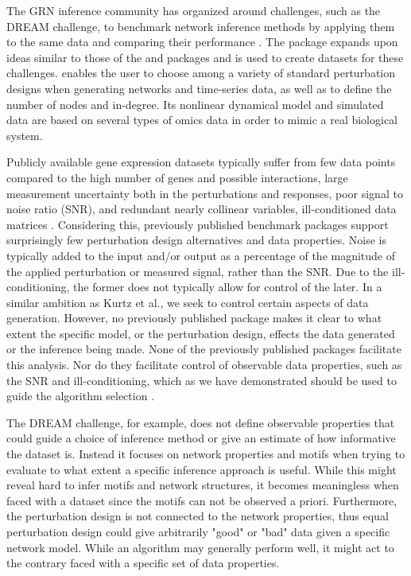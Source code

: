 The GRN inference community has organized around challenges, such as the DREAM
challenge, to benchmark network inference methods by applying them to the same data and comparing their performance \citep{Marbach2012}.
The package \emph{\gnw} \citep{Schaffter2011} expands upon ideas similar to those of the \emph{\syntren} and \emph{\genge} packages and is used to create datasets for these challenges.
\emph{\gnw} enables the user to choose among a variety of \insilico standard perturbation designs when generating networks and time-series data, as well as to define the number of nodes and in-degree.
Its nonlinear dynamical model and simulated data are based on several types of omics data in order to mimic a real biological system.

Publicly available gene expression datasets typically suffer from few data points compared to the high number of genes and possible interactions, large measurement uncertainty both in the perturbations and responses, \ie poor signal to noise ratio (SNR), and redundant nearly collinear variables, \ie ill-conditioned data matrices \citep{Nordling2013phdthesis}.
Considering this, previously published benchmark packages support surprisingly few perturbation design alternatives and data properties.
Noise is typically added to the input and/or output as a percentage of the magnitude of the applied perturbation or measured signal, rather than the SNR. Due to the ill-conditioning, the former does not typically allow for control of the later.
In a similar ambition as Kurtz et al.\cite{SPIEC-EASI2015}, we seek to control certain aspects of data generation.%
However, no previously published package makes it clear to what extent the specific model, or the perturbation design, effects the data generated or the inference being made.
None of the previously published packages facilitate this analysis. Nor do they facilitate control of observable data properties, such as the SNR and ill-conditioning, which as we have demonstrated should be used to guide the algorithm selection \citep{Tjarnberg2014}.

The DREAM challenge, for example, does not define observable properties that could guide a choice of inference method or give an estimate of how informative the dataset is. Instead it focuses on network properties and motifs when trying to evaluate to what extent a specific inference approach is useful.
While this might reveal hard to infer motifs and network structures, it becomes meaningless when faced with a dataset since the motifs can not be observed a priori.
Furthermore, the perturbation design is not connected to the network properties, thus equal perturbation design could give arbitrarily "good" or "bad" data given a specific network model.
While an algorithm may generally perform well, it might act to the contrary faced with a specific set of data properties.

